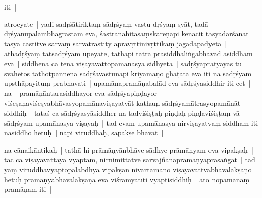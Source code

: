 \documentclass[article,12pt,a4paper]{memoir}%
\newcounter{parCount}
\begin{document}
	  
	  

	  \pstart \leavevmode%
	iti |
	{}
	\pend%
      

	  \pstart \leavevmode%
	atrocyate | yadi sadṛśātiriktaṃ sādṛśyaṃ vastu dṛśyaṃ syāt, tadā dṛśyānupalambhagrastam eva, śāstrānāhitasaṃskāreṇāpi kenacit tasyādarśanāt | tasya cāstitve sarvaṃ sarvatrāstīty apravṛttinivṛttikaṃ jagadāpadyeta | athādṛśyaṃ tatsādṛśyam upeyate, tathāpi tatra prasiddhaliṅgābhāvād asiddham eva | siddhena ca tena viṣayavattopamānasya sidhyeta | sādṛśyapratyayas tu svahetos tathotpannena sadṛśavastunāpi kriyamāṇo ghaṭata eva iti na sādṛśyam upsthāpayituṃ prabhavati | upamānapramāṇabalād eva sādṛśyasiddhir iti cet | na | pramāṇāntarasiddhayor eva sādṛśyapiṇḍayor viśeṣaṇaviśeṣyabhāvasyopamānaviṣayatvāt kathaṃ sādṛśyamātrasyopamānāt siddhiḥ | tataś ca sādṛśyasyāsiddher na tadviśiṣṭaḥ piṇḍaḥ piṇḍaviśiṣṭaṃ vā sādṛśyam upamānasya viṣayaḥ | tad evam upamānasya nirviṣayatvaṃ siddham iti nāsiddho hetuḥ | nāpi viruddhaḥ, sapakṣe bhāvāt |
	{}
	\pend%
      

	  \pstart \leavevmode%
	\label{thakur75-102.28}na cānaikāntikaḥ | tathā hi prāmāṇyānbhāve sādhye prāmāṇyam eva vipakṣaḥ | tac ca viṣayavattayā vyāptam, nirnimittatve sarvajñānaprāmāṇyaprasaṅgāt | tad yaṃ viruddhavyāptopalabdhyā vipakṣān nivartamāno viṣayavattvābhāvalakṣaṇo hetuḥ prāmāṇyābhāvalakṣaṇa eva viśrāmyatīti vyāptisiddhiḥ | ato nopamānaṃ pramāṇam iti |
	{}
	\pend%
      
\end{document}
